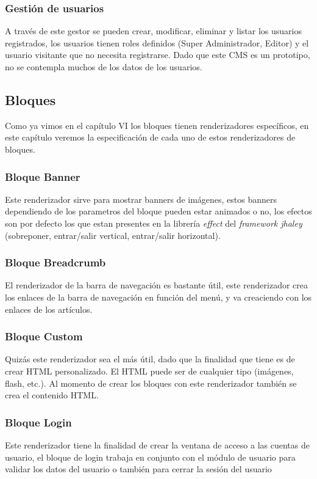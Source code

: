 \subsubsection{Gesti\'on de usuarios}
A trav\'es de este gestor se pueden crear, modificar, eliminar y listar los usuarios registrados, los usuarios tienen roles definidos (Super Administrador, Editor) y el usuario visitante que no necesita registrarse. Dado que este CMS es un prototipo, no se contempla muchos de los datos de los usuarios.

\subsection{Bloques}
Como ya vimos en el cap\'itulo VI los bloques tienen renderizadores espec\'ificos, en este cap\'itulo veremos la especificaci\'on de cada uno de estos renderizadores de bloques.

\subsubsection{Bloque Banner}
Este renderizador sirve para mostrar banners de im\'agenes, estos banners dependiendo de los parametros del bloque pueden estar animados o no, los efectos son por defecto los que estan presentes en la librer\'ia \textit{effect} del \textit{framework jhaley} (sobreponer, entrar/salir vertical, entrar/salir horizontal).

\subsubsection{Bloque Breadcrumb}
El renderizador de la barra de navegaci\'on es bastante \'util, este renderizador crea los enlaces de la barra de navegaci\'on en funci\'on del men\'u, y va creaciendo con los enlaces de los art\'iculos.

\subsubsection{Bloque Custom}
Quiz\'as este renderizador sea el m\'as \'util, dado que la finalidad que tiene es de crear HTML personalizado. El HTML puede ser de cualquier tipo (im\'agenes, flash, etc.). Al momento de crear los bloques con este renderizador tambi\'en se crea el contenido HTML.

\subsubsection{Bloque Login}
Este renderizador tiene la finalidad de crear la ventana de acceso a las cuentas de usuario, el bloque de login trabaja en conjunto con el m\'odulo de usuario para validar los datos del usuario o tambi\'en para cerrar la sesi\'on del usuario


